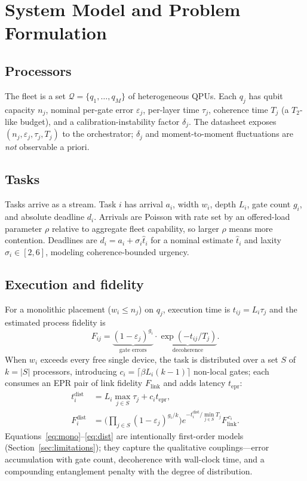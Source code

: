 \documentclass[conference]{IEEEtran}
\begin{document}
\section{System Model and Problem Formulation}
\label{sec:model}

\subsection{Processors}
The fleet is a set $\mathcal{Q}=\{q_1,\dots,q_M\}$ of heterogeneous QPUs. Each
$q_j$ has qubit capacity $n_j$, nominal per-gate error $\varepsilon_j$, per-layer
time $\tau_j$, coherence time $T_j$ (a $T_2$-like budget), and a
calibration-instability factor $\delta_j$. The datasheet exposes
$(n_j,\varepsilon_j,\tau_j,T_j)$ to the orchestrator; $\delta_j$ and
moment-to-moment fluctuations are \emph{not} observable a priori.

\subsection{Tasks}
Tasks arrive as a stream. Task $i$ has arrival $a_i$, width $w_i$, depth $L_i$,
gate count $g_i$, and absolute deadline $d_i$. Arrivals are Poisson with rate set
by an offered-load parameter $\rho$ relative to aggregate fleet capability, so
larger $\rho$ means more contention. Deadlines are $d_i=a_i+\sigma_i\hat{t}_i$ for
a nominal estimate $\hat{t}_i$ and laxity $\sigma_i\in[2,6]$, modeling
coherence-bounded urgency.

\subsection{Execution and fidelity}
For a monolithic placement ($w_i\le n_j$) on $q_j$, execution time is
$t_{ij}=L_i\tau_j$ and the estimated process fidelity is
\begin{equation}
F_{ij} = \underbrace{(1-\varepsilon_j)^{g_i}}_{\text{gate errors}} \cdot
\underbrace{\exp\!\left(-t_{ij}/T_j\right)}_{\text{decoherence}} .
\label{eq:mono}
\end{equation}
When $w_i$ exceeds every free single device, the task is distributed over a set
$S$ of $k=|S|$ processors, introducing $c_i=\lceil\beta L_i(k-1)\rceil$ non-local
gates; each consumes an EPR pair of link fidelity $F_{\text{link}}$ and adds
latency $t_{\text{epr}}$:
\begin{align}
t^{\text{dist}}_i &= L_i \max_{j\in S}\tau_j + c_i t_{\text{epr}},\\
F^{\text{dist}}_i &= \Big(\textstyle\prod_{j\in S}(1-\varepsilon_j)^{g_i/k}\Big)
e^{-t^{\text{dist}}_i/\min_{j\in S}T_j} F_{\text{link}}^{\,c_i}.
\label{eq:dist}
\end{align}
Equations~\eqref{eq:mono}--\eqref{eq:dist} are intentionally first-order models
(Section~\ref{sec:limitations}); they capture the qualitative couplings---error
accumulation with gate count, decoherence with wall-clock time, and a compounding
entanglement penalty with the degree of distribution.
\end{document}
